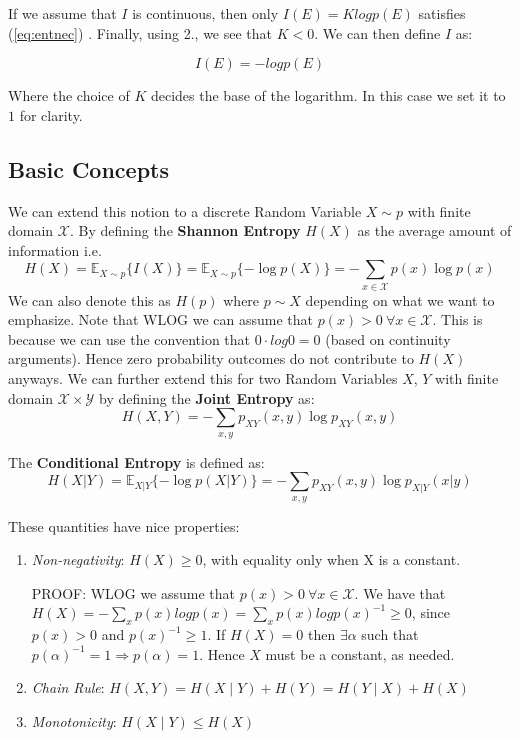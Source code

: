 \documentclass[]{article}
\theoremstyle{mattstyle}
\theoremstyle{definition}
\begin{document}
If we assume that $I$ is continuous, then only $I(E) = Klog p(E)$ satisfies (\ref{eq:entnec})  \cite{EntNotes}. Finally, using 2., we see that $K<0$. We can then define $I$ as:

\begin{equation}
I(E) = -log p(E)
\end{equation}

Where the choice of $K$ decides the base of the logarithm. In this case we set it to $1$ for clarity.

\subsection{Basic Concepts}
We can extend this notion to a discrete Random Variable $X\sim p$ with finite domain $\mathcal{X}$. By defining the \textbf{Shannon Entropy} $H(X)$ as the average amount of information i.e. 
\begin{equation}
H(X) = \mathbb{E}_{X\sim p}\{I(X)\} = \mathbb{E}_{X\sim p}\{-\log p(X)\} = -\sum_{x\in\mathcal{X}}p(x)\log p(x)
\end{equation}
We can also denote this as $H(p)$ where $p \sim X$ depending on what we want to emphasize. Note that WLOG we can assume that \(p(x)>0 \ \forall x\in\mathcal{X}\). This is because we can use the convention that \(0\cdot log0 = 0\) (based on continuity arguments). Hence zero probability outcomes do not contribute to $H(X)$ anyways. We can further extend this for two Random Variables $X$, $Y$ with finite domain \(\mathcal{X}\times\mathcal{Y}\) by defining the \textbf{Joint Entropy} as:
\begin{equation}
H(X,Y) = -\sum_{x,y}p_{XY}(x,y)\log p_{XY}(x,y)
\end{equation}

The \textbf{Conditional Entropy} is defined as:
\begin{equation}
H(X|Y) = \mathbb{E}_{X|Y}\{-\log p(X|Y)\} = -\sum_{x,y}p_{XY}(x,y)\log p_{X|Y}(x|y)
\end{equation}

These quantities have nice properties:
\begin{enumerate}
	\item \emph{Non-negativity}: \(H(X)\ge0\), with equality only when X is a constant.
	
	PROOF: WLOG we assume that \(p(x)>0 \ \forall x\in\mathcal{X}\). We have that \(H(X) = -\sum_{x} p(x)logp(x) = \sum_{x} p(x)logp(x)^{-1}\ge0\), since \(p(x)>0\) and \(p(x)^{-1} \ge 1\). If \(H(X)=0\) then \(\exists \alpha\) such that \(p(\alpha)^{-1}=1 \Rightarrow p(\alpha)=1\). Hence \(X\) must be a constant, as needed.
	
	\item \emph{Chain Rule}: $H(X,Y) = H(X \mid Y) + H(Y) = H(Y \mid X) + H(X)$ 
	\item \emph{Monotonicity}: $H(X\mid Y) \le H(X)$ 
\end{enumerate}
\end{document}
